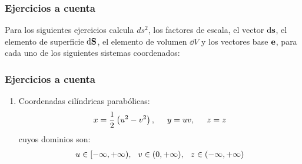 \documentclass[12pt]{beamer}
\begin{document}
\begin{frame}
\frametitle{Ejercicios a cuenta}
Para los siguientes ejercicios calcula $ds^{2}$, los factores de escala, el vector $\dd{\vb{s}}$, el elemento de superficie $\dd{\vb{S}}$, el elemento de volumen $\dd{V}$ y los vectores base $\vb{e}$, para cada uno de los siguientes sistemas coordenados:
\end{frame}
\begin{frame}
\frametitle{Ejercicios a cuenta}
\begin{enumerate}[<+->]
\item  Coordenadas cilíndricas parabólicas:
\begin{align*}
x = \dfrac{1}{2} \left( u^{2} - v^{2} \right), \hspace{0.5cm} y = uv, \hspace{0.5cm} z = z
\end{align*}
cuyos dominios son:
\begin{align*}
u \in [-\infty, +\infty), \hspace{0.25cm} v \in (0, +\infty), \hspace{0.25cm} z \in (-\infty, +\infty)
\end{align*}
\seti
\end{enumerate}
\end{frame}
\end{document}
